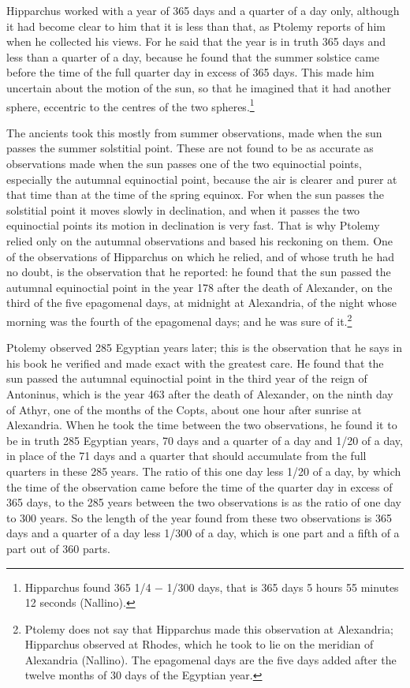 \documentclass[11pt]{article}
\newcommand{\ArPage}[1]{\marginpar{\footnotesize\color{gray}Ar.\,p.\,#1}}
\begin{document}
\par Hipparchus worked with a year of 365 days and a quarter of a day only, although it had become clear to him that it is less than that, as Ptolemy reports of him when he collected his views. For he said that the year is in truth 365 days and less than a quarter of a day, because he found that the summer solstice came before the time of the full quarter day in excess of 365 days. This made him uncertain about the motion of the sun, so that he imagined that it had another sphere, eccentric to the centres of the two spheres.\footnote{Hipparchus found 365 1/4 − 1/300 days, that is 365 days 5 hours 55 minutes 12 seconds (Nallino).}\par
\par \ArPage{62}The ancients took this mostly from summer observations, made when the sun passes the summer solstitial point. These are not found to be as accurate as observations made when the sun passes one of the two equinoctial points, especially the autumnal equinoctial point, because the air is clearer and purer at that time than at the time of the spring equinox. For when the sun passes the solstitial point it moves slowly in declination, and when it passes the two equinoctial points its motion in declination is very fast. That is why Ptolemy relied only on the autumnal observations and based his reckoning on them. One of the observations of Hipparchus on which he relied, and of whose truth he had no doubt, is the observation that he reported: he found that the sun passed the autumnal equinoctial point in the year 178 after the death of Alexander, on the third of the five epagomenal days, at midnight at Alexandria, of the night whose morning was the fourth of the epagomenal days; and he was sure of it.\footnote{Ptolemy does not say that Hipparchus made this observation at Alexandria; Hipparchus observed at Rhodes, which he took to lie on the meridian of Alexandria (Nallino). The epagomenal days are the five days added after the twelve months of 30 days of the Egyptian year.}\par
\par Ptolemy observed 285 Egyptian years later; this is the observation that he says in his book he verified and made exact with the greatest care. He found that the sun passed the autumnal equinoctial point in the third year of the reign of Antoninus, which is the year 463 after the death of Alexander, on the ninth day of Athyr, one of the months of the Copts, about one hour after sunrise at Alexandria. When he took the time between the two observations, he found it to be in truth 285 Egyptian years, 70 days and a quarter of a day and 1/20 of a day, in place of the 71 days and a quarter that should accumulate from the full quarters in these 285 years. The ratio of this one day less 1/20 of a day, by which the time of the observation came before the time of the quarter day in excess of 365 days, to the 285 years between the two observations is as the ratio of one day to 300 years. So the length of the year found from these two observations is 365 days and a quarter of a day less 1/300 of a day, which is one part and a fifth of a part out of 360 parts.\par
\end{document}
